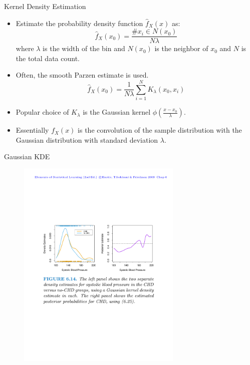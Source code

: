 \documentclass[aspectratio=169]{beamer}
\begin{document}
\begin{frame}{Kernel Density Estimation}
    \begin{itemize}
        \item Estimate the probability density function $\hat{f}_X(x)$ as:
        \begin{equation*}
            \hat{f}_X(x_0) = \frac{\# x_i \in N(x_0)}{N\lambda}
        \end{equation*}
        where $\lambda$ is the width of the bin and $N(x_0)$ is the neighbor of $x_0$ and $N$ is the total data count.
        \item Often, the smooth Parzen estimate is used.
        \begin{equation*}
            \hat{f}_X(x_0) = \frac{1}{N\lambda}\sum_{i=1}^{N} K_{\lambda}(x_0, x_i)
        \end{equation*}
        \item Popular choice of $K_{\lambda}$ is the Gaussian kernel $\phi(\frac{x-x_0}{\lambda})$.
        \item Essentially $f_X(x)$ is the convolution of the sample distribution with the Gaussian distribution with standard deviation $\lambda$.
    \end{itemize}
\end{frame}


\begin{frame}{Gaussian KDE}
\begin{figure}
    \centering
    \includegraphics[width=0.7\textwidth]{figures/gaussian_kde.pdf}
\end{figure}
\end{frame}
\end{document}
